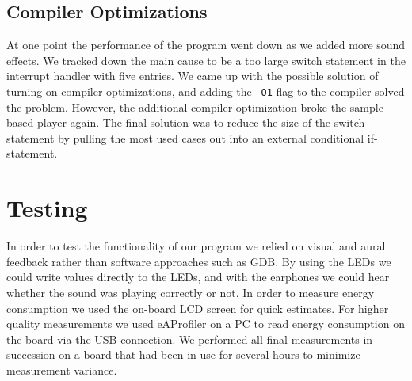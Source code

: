 \subsection{Compiler Optimizations}
At one point the performance of the program went down as we added more sound effects. We tracked down the main cause to be a too large switch statement in the interrupt handler with five entries. We came up with the possible solution of turning on compiler optimizations, and adding the \texttt{-O1} flag to the compiler solved the problem. However, the additional compiler optimization broke the sample-based player again. The final solution was to reduce the size of the switch statement by pulling the most used cases out into an external conditional if-statement.

\section{Testing}
In order to test the functionality of our program we relied on visual and aural feedback rather than software approaches such as GDB. By using the LEDs we could write values directly to the LEDs, and with the earphones we could hear whether the sound was playing correctly or not. In order to measure energy consumption we used the on-board LCD screen for quick estimates. For higher quality measurements we used eAProfiler on a PC to read energy consumption on the board via the USB connection. We performed all final measurements in succession on a board that had been in use for several hours to minimize measurement variance. 

